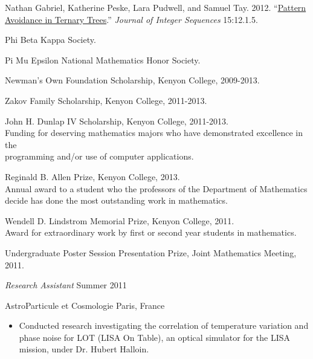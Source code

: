 \documentclass[11pt,article,oneside]{memoir}
\begin{document}
\bigskip



\ind Nathan Gabriel, Katherine Peske, Lara Pudwell, and Samuel Tay. 2012.
  ``\href{http://arxiv.org/abs/1110.2225}{Pattern Avoidance in Ternary Trees}.''
  \emph{Journal of Integer Sequences} 15:12.1.5. \vspace{0.05in}

\bigskip



\ind Phi Beta Kappa Society.

\ind Pi Mu Epsilon National Mathematics Honor Society.

\ind Newman's Own Foundation Scholarship, Kenyon College, 2009-2013.

\ind Zakov Family Scholarship, Kenyon College, 2011-2013.

\ind John H. Dunlap IV Scholarship, Kenyon College, 2011-2013. \\
\footnotesize
  Funding for deserving mathematics majors who have demonstrated excellence in
  the \\ programming and/or use of computer applications.
\normalsize

\ind Reginald B. Allen Prize, Kenyon College, 2013. \\
\footnotesize
  Annual award to a student who the professors of the Department of
  Mathematics decide has done the most outstanding work in mathematics.
\normalsize

\ind Wendell D. Lindstrom Memorial Prize, Kenyon College, 2011. \\
\footnotesize
  Award for extraordinary work by first or second year students in mathematics.
\normalsize

\ind Undergraduate Poster Session Presentation Prize, Joint Mathematics Meeting, 2011. \\

\bigskip
 


\ind \emph{Research Assistant} \hfill {\small Summer 2011}

\ind AstroParticule et Cosmologie \hfill {\small Paris, France}
\small
\begin{itemize}
  \item Conducted research investigating the correlation of temperature
    variation and phase noise for LOT (LISA On Table), an optical simulator for
    the LISA mission, under Dr. Hubert Halloin.
\end{itemize}
\normalsize
\end{document}
